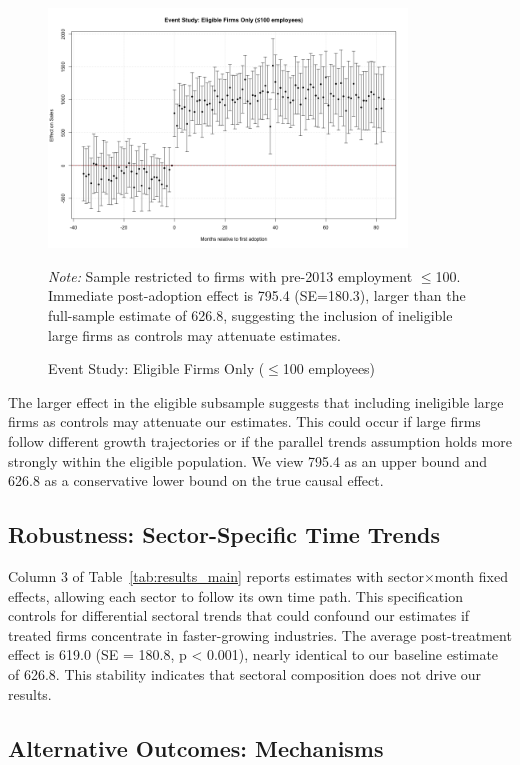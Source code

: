 \documentclass{article}
\begin{document}
\begin{figure}[htbp]
\centering
\includegraphics[width=0.85\textwidth]{es_eligible_sample.png}
\caption{Event Study: Eligible Firms Only ($\leq$100 employees)}
\label{fig:es_eligible}
\vspace{-0.5em}
{\small \textit{Note:} Sample restricted to firms with pre-2013 employment $\leq$100. Immediate post-adoption effect is 795.4 (SE=180.3), larger than the full-sample estimate of 626.8, suggesting the inclusion of ineligible large firms as controls may attenuate estimates.}
\end{figure}

The larger effect in the eligible subsample suggests that including ineligible large firms as controls may attenuate our estimates. This could occur if large firms follow different growth trajectories or if the parallel trends assumption holds more strongly within the eligible population. We view 795.4 as an upper bound and 626.8 as a conservative lower bound on the true causal effect.

\subsection{Robustness: Sector-Specific Time Trends}

Column 3 of Table~\ref{tab:results_main} reports estimates with sector$\times$month fixed effects, allowing each sector to follow its own time path. This specification controls for differential sectoral trends that could confound our estimates if treated firms concentrate in faster-growing industries. The average post-treatment effect is 619.0 (SE = 180.8, p < 0.001), nearly identical to our baseline estimate of 626.8. This stability indicates that sectoral composition does not drive our results.

\subsection{Alternative Outcomes: Mechanisms}
\end{document}
